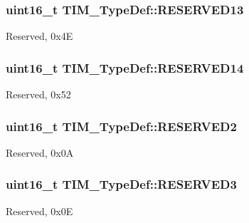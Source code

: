 \subsubsection[{\texorpdfstring{R\+E\+S\+E\+R\+V\+E\+D13}{RESERVED13}}]{\setlength{\rightskip}{0pt plus 5cm}uint16\+\_\+t T\+I\+M\+\_\+\+Type\+Def\+::\+R\+E\+S\+E\+R\+V\+E\+D13}\hypertarget{struct_t_i_m___type_def_a5a831b0a42a5428fbbfd550b7a9c8108}{}\label{struct_t_i_m___type_def_a5a831b0a42a5428fbbfd550b7a9c8108}
Reserved, 0x4E 
\subsubsection[{\texorpdfstring{R\+E\+S\+E\+R\+V\+E\+D14}{RESERVED14}}]{\setlength{\rightskip}{0pt plus 5cm}uint16\+\_\+t T\+I\+M\+\_\+\+Type\+Def\+::\+R\+E\+S\+E\+R\+V\+E\+D14}\hypertarget{struct_t_i_m___type_def_a548510ebbe395a3947dbbc49fcccec0d}{}\label{struct_t_i_m___type_def_a548510ebbe395a3947dbbc49fcccec0d}
Reserved, 0x52 
\subsubsection[{\texorpdfstring{R\+E\+S\+E\+R\+V\+E\+D2}{RESERVED2}}]{\setlength{\rightskip}{0pt plus 5cm}uint16\+\_\+t T\+I\+M\+\_\+\+Type\+Def\+::\+R\+E\+S\+E\+R\+V\+E\+D2}\hypertarget{struct_t_i_m___type_def_af62f86f55f2a387518f3de10d916eb7c}{}\label{struct_t_i_m___type_def_af62f86f55f2a387518f3de10d916eb7c}
Reserved, 0x0A 
\subsubsection[{\texorpdfstring{R\+E\+S\+E\+R\+V\+E\+D3}{RESERVED3}}]{\setlength{\rightskip}{0pt plus 5cm}uint16\+\_\+t T\+I\+M\+\_\+\+Type\+Def\+::\+R\+E\+S\+E\+R\+V\+E\+D3}\hypertarget{struct_t_i_m___type_def_a8f952613a22049f3ea2b50b7e0d10472}{}\label{struct_t_i_m___type_def_a8f952613a22049f3ea2b50b7e0d10472}
Reserved, 0x0E 
